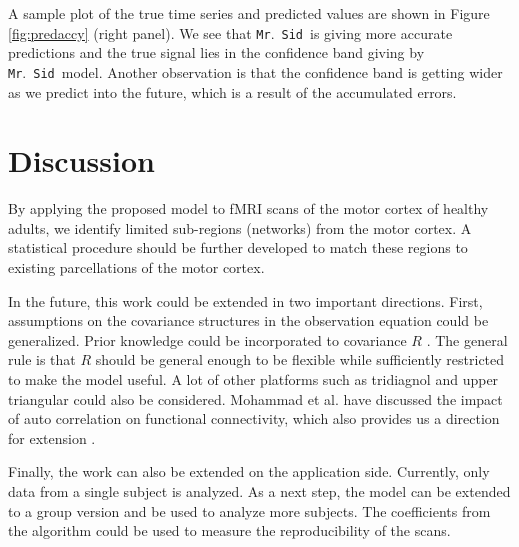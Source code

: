 \documentclass[fleqn,12pt]{article}
\let\oldref\ref
\renewcommand{\ref}[1]{(\oldref{#1})}
\newcommand{\mrsid}{{\sc \texttt{Mr}.~\texttt{Sid}}}
\begin{document}

A sample plot of the true time series and predicted values are shown in Figure \oldref{fig:predaccy} (right panel). We see that \mrsid~is giving more accurate predictions and the true signal lies in the confidence band giving by \mrsid~model. Another observation is that the confidence band is getting wider as we predict into the future, which is a result of the accumulated errors.


\section{Discussion}

By applying the proposed model to fMRI scans of the motor cortex of healthy adults, we identify limited sub-regions (networks) from the motor cortex. A statistical procedure should be further developed to match these regions to existing parcellations of the motor cortex.

In the future, this work could be extended in two important directions. First, assumptions on the covariance structures in the observation equation could be generalized. Prior knowledge could be incorporated to covariance $R$ \citep{allen2014generalized}. The general rule is that $R$ should be general enough to be flexible while sufficiently restricted to make the model useful. A lot of other platforms such as tridiagnol and upper triangular could also be considered. Mohammad et al. have discussed the impact of auto correlation on functional connectivity, which also provides us a direction for extension \citep{arbabshirani2014impact}.

Finally, the work can also be extended on the application side. Currently, only data from a single subject is analyzed. As a next step, the model can be extended to a group version and be used to analyze more subjects. The coefficients from the algorithm could be used to measure the reproducibility of the scans.

%


\end{document}

